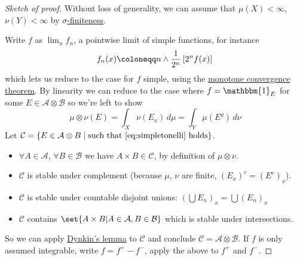 \documentclass{article}
\newcommand{\1}[1]{\mathbbm{1}_{#1}}
\begin{document}
\begin{proof}[Sketch of proof]
    Without loss of generality, we can assume that $\mu(X) < \infty$, $\nu(Y) < \infty$ by \hyperlink{def:sigFinite}{$\sigma$-finiteness}.

    Write $f$ as $\lim_n f_n$, a pointwise limit of simple functions, for instance
    \begin{equation*}
        f_n(x) \coloneqq n \wedge \frac{1}{2^n} \left[2^n f(x)\right] \\
    \end{equation*}
    which lets us reduce to the case for $f$ simple, using the \hyperlink{def:monConv}{monotone convergence theorem}.
    By linearity we can reduce to the case where $f = \1{E}$ for some $E \in \mathcal{A} \otimes \mathcal{B}$ so we're left to show
    \begin{equation*}
        \mu \otimes \nu(E) = \int_X \nu(E_x)\,d\mu = \int_Y \mu(E^y)\,d\nu \tag{$***$}\label{eq:simpletonelli}
    \end{equation*}
    Let $\mathcal{C} = \{E \in \mathcal{A} \otimes B \mid \text{such that } \eqref{eq:simpletonelli} \text{ holds} \}$.
    \begin{itemize}
        \item $\forall A \in \mathcal{A}$, $\forall B \in \mathcal{B}$ we have $A \times B \in \mathcal{C}$, by definition of $\mu \otimes \nu$.
        \item $\mathcal{C}$ is stable under complement (because $\mu$, $\nu$ are finite, $(E_x)^c = (E^c)_x$).
        \item $\mathcal{C}$ is stable under countable disjoint unions: $(\bigcup E_n)_x = \bigcup(E_n)_x$
        \item $\mathcal{C}$ contains $\set{A \times B | A \in \mathcal{A}, B \in \mathcal{B}}$ which is stable under intersections.
    \end{itemize}
    So we can apply \hyperlink{lem:dynkin}{Dynkin's lemma} to $\mathcal{C}$ and conclude $\mathcal{C} = \mathcal{A} \otimes \mathcal{B}$.
    If $f$ is only assumed integrable, write $f = f^+ - f^-$, apply the above to $f^+$ and $f^-$.
\end{proof}

\end{document}
